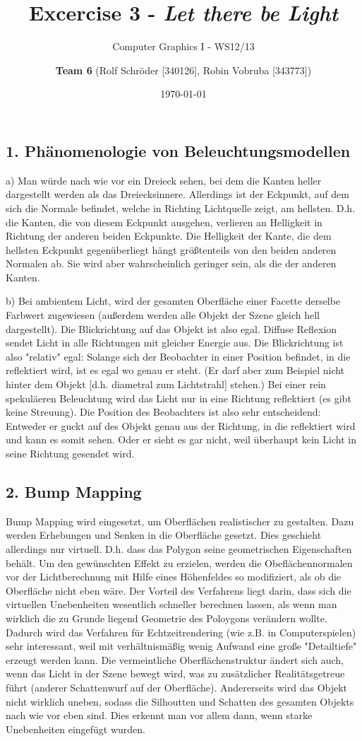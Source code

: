 \documentclass[a4paper,headings=small]{scrartcl}
\title{Excercise 3 - \emph{Let there be Light}}
\subtitle{Computer Graphics I - WS12/13}
\author{\textbf{Team 6} (Rolf Schröder [340126], Robin Vobruba [343773])}
\date{\today}
\numberwithin{equation}{section} %
\numberwithin{figure}{section}   %
\begin{document}
\maketitle


\subsection*{1. Phänomenologie von Beleuchtungsmodellen}
a) Man würde nach wie vor ein Dreieck sehen, bei dem die Kanten heller dargestellt werden als das Dreiecksinnere.
Allerdings ist der Eckpunkt, auf dem sich die Normale befindet, welche in Richting Lichtquelle zeigt, am hellsten.
D.h. die Kanten, die von diesem Eckpunkt ausgehen, verlieren an Helligkeit in Richtung der anderen beiden Eckpunkte.
Die Helligkeit der Kante, die dem hellsten Eckpunkt gegenüberliegt hängt größtenteils von den beiden anderen Normalen ab.
Sie wird aber wahrscheinlich geringer sein, als die der anderen Kanten.

b) Bei ambientem Licht, wird der gesamten Oberfläche einer Facette derselbe Farbwert zugewiesen (außerdem werden alle Objekt der Szene gleich hell dargestellt).
Die Blickrichtung auf das Objekt ist also egal.
Diffuse Reflexion sendet Licht in alle Richtungen mit gleicher Energie aus.
Die Blickrichtung ist also "relativ" egal:
Solange sich der Beobachter in einer Position befindet, in die reflektiert wird, ist es egal wo genau er steht.
(Er darf aber zum Beispiel nicht hinter dem Objekt [d.h. diametral zum Lichtstrahl] stehen.)
Bei einer rein spekuläeren Beleuchtung wird das Licht nur in eine Richtung reflektiert (es gibt keine Streuung).
Die Position des Beobachters ist also sehr entscheidend:
Entweder er guckt auf des Objekt genau aus der Richtung, in die reflektiert wird und kann es somit sehen.
Oder er sieht es gar nicht, weil überhaupt kein Licht in seine Richtung gesendet wird.

\subsection*{2. Bump Mapping}
Bump Mapping wird eingesetzt, um Oberflächen realistischer zu gestalten.
Dazu werden Erhebungen und Senken in die Oberfläche gesetzt.
Dies geschieht allerdings nur virtuell.
D.h. dass das Polygon seine geometrischen Eigenschaften behält.
Um den gewünschten Effekt zu erzielen, werden die Obeflächennormalen vor der Lichtberechnung mit Hilfe eines Höhenfeldes so modifiziert, als ob die Oberfläche nicht eben wäre.
Der Vorteil des Verfahrens liegt darin, dass sich die virtuellen Unebenheiten wesentlich schneller berechnen lassen, als wenn man wirklich die zu Grunde liegend Geometrie des Poloygons verändern wollte. Dadurch wird das Verfahren für Echtzeitrendering (wie z.B. in Computerspielen) sehr interessant, weil mit verhältnismäßig wenig Aufwand eine große "Detailtiefe" erzeugt werden kann. Die vermeintliche Oberflächenstruktur ändert sich auch, wenn das Licht in der Szene bewegt wird, was zu zusätzlicher Realitätsgetreue führt (anderer Schattenwurf auf der Oberfläche).
Andererseits wird das Objekt nicht wirklich uneben, sodass die Silhoutten und Schatten des gesamten Objekts nach wie vor eben sind. Dies erkennt man vor allem dann, wenn starke Unebenheiten eingefügt wurden.
\end{document}
